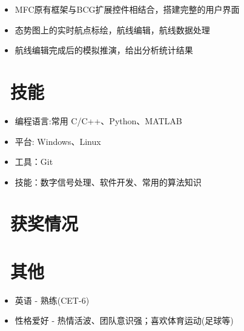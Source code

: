 \documentclass{resume}
\begin{document}
\begin{itemize}[topsep = 0 pt, partopsep = 0pt]
  \item MFC原有框架与BCG扩展控件相结合，搭建完整的用户界面
  \item 态势图上的实时航点标绘，航线编辑，航线数据处理
  \item 航线编辑完成后的模拟推演，给出分析统计结果
\end{itemize}



\section{\faCogs\ 技能}
\begin{itemize}[parsep=0.5ex]
  \item 编程语言:常用 C/C++、Python、MATLAB  
  \item 平台: Windows、Linux
  \item 工具：Git
  \item 技能：数字信号处理、软件开发、常用的算法知识
\end{itemize}

\section{\faHeartO\ 获奖情况}

\section{\faInfo\ 其他}
\begin{itemize}[parsep=0.5ex]
  \item  英语 - 熟练(CET-6)
  \item  性格爱好 - 热情活波、团队意识强；喜欢体育运动(足球等)
\end{itemize}
\end{document}

